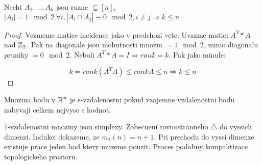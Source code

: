 \begin{theorem}
	Necht $A_1, ... , A_k$ jsou ruzne $ \subseteq [n]$, $ |A_i| = 1 \mod2 \ \forall i, |A_i \cap A_j| \equiv 0 \mod2, i \ne j \Rightarrow k \leq n$
\end{theorem}
\begin{proof}
	Vezmeme matice incidence jako v predchozi vete. Uvazme matici $A^T * A$ nad $\operatorname{\mathbb{Z}}_2$. Pak na diagonale jsou mohutnosti mnozin $ = 1 \mod2$, mimo diagonalu pruniky $= 0 \mod2$. Neboli $A^T * A = I \Rightarrow rank = k$. Pak jako minule:

	\[ k = rank(A^TA) \leq rank A \leq n \Rightarrow k \leq n \]
\end{proof}

\begin{definition}
Mnozina bodu v $\operatorname{\mathbb{R}}^n$ je s-vzdalenostni pokud vzajemne vzdalenostni bodu nabyvaji celkem nejvyse s hodnot.
\end{definition}

\begin{observation}
	1-vzdalenostni mnoziny jsou simplexy. Zobecneni rovnostranneho $\triangle$ do vyssich dimenzi. Indukci dokazeme, ze $m_1(n) = n + 1$. Pri prechodu do vyssi dimenze existuje prace jeden bod ktery muzeme pouzit. Proces podobny kompaktizace topologickeho prostoru.
\end{observation}


